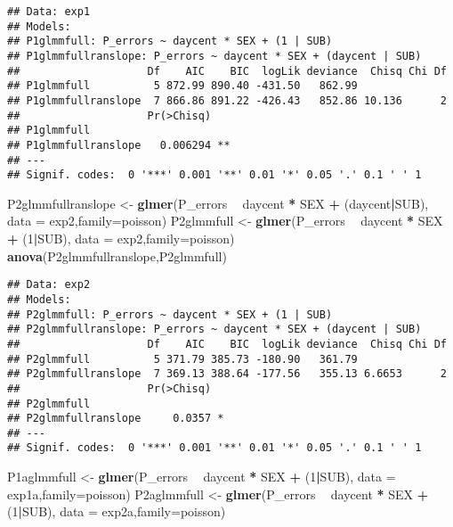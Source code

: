 \documentclass[]{article}
\newenvironment{Shaded}{\begin{snugshade}}{\end{snugshade}}
\newcommand{\KeywordTok}[1]{\textcolor[rgb]{0.13,0.29,0.53}{\textbf{#1}}}
\newcommand{\DataTypeTok}[1]{\textcolor[rgb]{0.13,0.29,0.53}{#1}}
\newcommand{\DecValTok}[1]{\textcolor[rgb]{0.00,0.00,0.81}{#1}}
\newcommand{\StringTok}[1]{\textcolor[rgb]{0.31,0.60,0.02}{#1}}
\newcommand{\OperatorTok}[1]{\textcolor[rgb]{0.81,0.36,0.00}{\textbf{#1}}}
\newcommand{\NormalTok}[1]{#1}
\begin{document}
\begin{verbatim}
## Data: exp1
## Models:
## P1glmmfull: P_errors ~ daycent * SEX + (1 | SUB)
## P1glmmfullranslope: P_errors ~ daycent * SEX + (daycent | SUB)
##                    Df    AIC    BIC  logLik deviance  Chisq Chi Df
## P1glmmfull          5 872.99 890.40 -431.50   862.99              
## P1glmmfullranslope  7 866.86 891.22 -426.43   852.86 10.136      2
##                    Pr(>Chisq)   
## P1glmmfull                      
## P1glmmfullranslope   0.006294 **
## ---
## Signif. codes:  0 '***' 0.001 '**' 0.01 '*' 0.05 '.' 0.1 ' ' 1
\end{verbatim}

\begin{Shaded}
\begin{Highlighting}[]
\NormalTok{P2glmmfullranslope <-}\StringTok{ }\KeywordTok{glmer}\NormalTok{(P_errors }\OperatorTok{~}\StringTok{ }\NormalTok{daycent }\OperatorTok{*}\StringTok{ }\NormalTok{SEX }\OperatorTok{+}\StringTok{ }\NormalTok{(daycent}\OperatorTok{|}\NormalTok{SUB), }\DataTypeTok{data =}\NormalTok{ exp2,}\DataTypeTok{family=}\NormalTok{poisson)}
\NormalTok{P2glmmfull <-}\StringTok{ }\KeywordTok{glmer}\NormalTok{(P_errors }\OperatorTok{~}\StringTok{ }\NormalTok{daycent }\OperatorTok{*}\StringTok{ }\NormalTok{SEX }\OperatorTok{+}\StringTok{ }\NormalTok{(}\DecValTok{1}\OperatorTok{|}\NormalTok{SUB), }\DataTypeTok{data =}\NormalTok{ exp2,}\DataTypeTok{family=}\NormalTok{poisson)}
\KeywordTok{anova}\NormalTok{(P2glmmfullranslope,P2glmmfull)}
\end{Highlighting}
\end{Shaded}

\begin{verbatim}
## Data: exp2
## Models:
## P2glmmfull: P_errors ~ daycent * SEX + (1 | SUB)
## P2glmmfullranslope: P_errors ~ daycent * SEX + (daycent | SUB)
##                    Df    AIC    BIC  logLik deviance  Chisq Chi Df
## P2glmmfull          5 371.79 385.73 -180.90   361.79              
## P2glmmfullranslope  7 369.13 388.64 -177.56   355.13 6.6653      2
##                    Pr(>Chisq)  
## P2glmmfull                     
## P2glmmfullranslope     0.0357 *
## ---
## Signif. codes:  0 '***' 0.001 '**' 0.01 '*' 0.05 '.' 0.1 ' ' 1
\end{verbatim}

\begin{Shaded}
\begin{Highlighting}[]
\NormalTok{P1aglmmfull <-}\StringTok{ }\KeywordTok{glmer}\NormalTok{(P_errors }\OperatorTok{~}\StringTok{ }\NormalTok{daycent }\OperatorTok{*}\StringTok{ }\NormalTok{SEX }\OperatorTok{+}\StringTok{ }\NormalTok{(}\DecValTok{1}\OperatorTok{|}\NormalTok{SUB), }\DataTypeTok{data =}\NormalTok{ exp1a,}\DataTypeTok{family=}\NormalTok{poisson)}
\NormalTok{P2aglmmfull <-}\StringTok{ }\KeywordTok{glmer}\NormalTok{(P_errors }\OperatorTok{~}\StringTok{ }\NormalTok{daycent }\OperatorTok{*}\StringTok{ }\NormalTok{SEX }\OperatorTok{+}\StringTok{ }\NormalTok{(}\DecValTok{1}\OperatorTok{|}\NormalTok{SUB), }\DataTypeTok{data =}\NormalTok{ exp2a,}\DataTypeTok{family=}\NormalTok{poisson)}
\end{Highlighting}
\end{Shaded}
\end{document}
